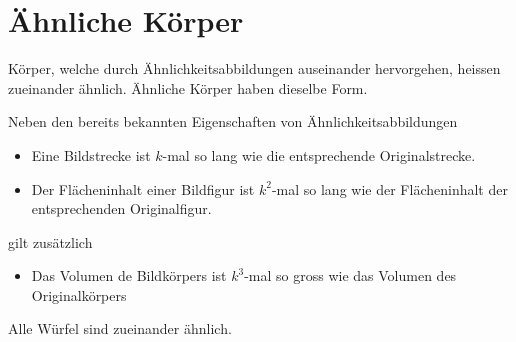\documentclass[%
11pt,%
twoside,%
titlepage,%
a4page,%
headsepline%
]{scrartcl}
\begin{document}
\section{\"Ahnliche K\"orper}
K\"orper, welche durch \"Ahnlichkeitsabbildungen auseinander hervorgehen, heissen zueinander \"ahnlich. \"Ahnliche K\"orper haben dieselbe Form.

Neben den bereits bekannten Eigenschaften von \"Ahnlichkeitsabbildungen
\begin{itemize}
\item Eine Bildstrecke ist $k$-mal so lang wie die entsprechende Originalstrecke.
\item Der Fl\"acheninhalt einer Bildfigur ist $k^2$-mal so lang wie der Fl\"acheninhalt der entsprechenden Originalfigur.
\end{itemize}
gilt zus\"atzlich
\begin{itemize}
\item Das Volumen de Bildk\"orpers ist $k^3$-mal so gross wie das Volumen des Originalk\"orpers%
\end{itemize}

\pagebreak

\begin{bsp}
Alle W\"urfel sind zueinander \"ahnlich.\\

\begin{center}
\end{center}
\end{bsp}
\end{document}
